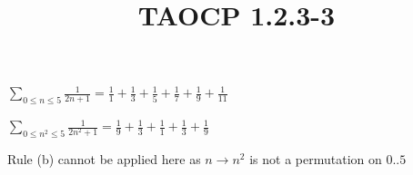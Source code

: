 \documentclass{article}
\title{TAOCP 1.2.3\mbox{-}3}
\begin{document}
\maketitle

\( \sum_{0\leq n \leq 5}\frac{1}{2n+1} = \frac{1}{1} + \frac{1}{3} + \frac{1}{5} + \frac{1}{7} + \frac{1}{9} + \frac{1}{11} \)

\( \sum_{0\leq n^{2} \leq 5}\frac{1}{2n^{2}+1} = \frac{1}{9} + \frac{1}{3} + \frac{1}{1} + \frac{1}{3} + \frac{1}{9} \)

Rule (b) cannot be applied here as \( n \to n^{2} \) is not a permutation on \( 0..5 \)
\end{document}
